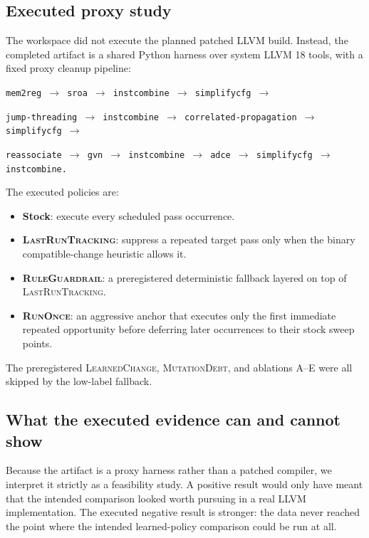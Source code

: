 \documentclass{article}
\begin{document}
\subsection{Executed proxy study}

The workspace did not execute the planned patched LLVM build. Instead, the completed artifact is a shared Python harness over system LLVM 18 tools, with a fixed proxy cleanup pipeline:
\begin{center}
\small
\texttt{mem2reg $\rightarrow$ sroa $\rightarrow$ instcombine $\rightarrow$ simplifycfg $\rightarrow$}

\texttt{jump-threading $\rightarrow$ instcombine $\rightarrow$ correlated-propagation $\rightarrow$ simplifycfg $\rightarrow$}

\texttt{reassociate $\rightarrow$ gvn $\rightarrow$ instcombine $\rightarrow$ adce $\rightarrow$ simplifycfg $\rightarrow$ instcombine.}
\end{center}

The executed policies are:
\begin{itemize}
  \item \textbf{Stock}: execute every scheduled pass occurrence.
  \item \textbf{\textsc{LastRunTracking}}: suppress a repeated target pass only when the binary compatible-change heuristic allows it.
  \item \textbf{\textsc{RuleGuardrail}}: a preregistered deterministic fallback layered on top of \textsc{LastRunTracking}.
  \item \textbf{\textsc{RunOnce}}: an aggressive anchor that executes only the first immediate repeated opportunity before deferring later occurrences to their stock sweep points.
\end{itemize}

The preregistered \textsc{LearnedChange}, \textsc{MutationDebt}, and ablations A--E were all skipped by the low-label fallback.

\subsection{What the executed evidence can and cannot show}

Because the artifact is a proxy harness rather than a patched compiler, we interpret it strictly as a feasibility study. A positive result would only have meant that the intended comparison looked worth pursuing in a real LLVM implementation. The executed negative result is stronger: the data never reached the point where the intended learned-policy comparison could be run at all.
\end{document}
